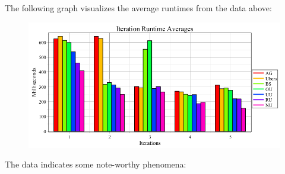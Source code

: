 \documentclass{article}
\begin{document}
The following graph visualizes the average runtimes from the data above:
\begin{figure}[H]
	\includegraphics[width=\textwidth]{RuntimeAverages.png}
	\centering
	\caption{}\label{RunTimeAveragesGraph}
\end{figure}
The data indicates some note-worthy phenomena:
\end{document}
